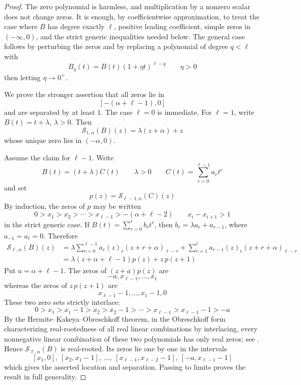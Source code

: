 \documentclass[a4paper,11pt,reqno]{amsart}
\numberwithin{equation}{section}
\theoremstyle{remark}
\begin{document}
\begin{proof}
The zero polynomial is harmless, and multiplication by a nonzero scalar does not change zeros. It is enough, by coefficientwise approximation, to treat the case where \(B\) has degree exactly \(\ell\), positive leading coefficient, simple zeros in \((-\infty,0)\), and the strict generic inequalities needed below. The general case follows by perturbing the zeros and by replacing a polynomial of degree \(q<\ell\) with
\[
  B_\eta(t)=B(t)(1+\eta t)^{\ell-q}
  \qquad \eta>0
\]
then letting \(\eta\to0^+\).

We prove the stronger assertion that all zeros lie in
\[
  [-(\alpha+\ell-1),0]
\]
and are separated by at least \(1\). The case \(\ell=0\) is immediate. For \(\ell=1\), write \(B(t)=t+\lambda\), \(\lambda>0\). Then
\[
  \mathcal S_{1,\alpha}(B)(z)
  =
  \lambda(z+\alpha)+z
\]
whose unique zero lies in \((-\alpha,0)\).

Assume the claim for \(\ell-1\). Write
\[
  B(t)=(t+\lambda)C(t)
  \qquad
  \lambda>0
  \qquad
  C(t)=\sum_{r=0}^{\ell-1}a_rt^r
\]
and set
\[
  p(z)=\mathcal S_{\ell-1,\alpha}(C)(z)
\]
By induction, the zeros of \(p\) may be written
\[
  0>x_1>x_2>\cdots>x_{\ell-1}>-(\alpha+\ell-2)
  \qquad
  x_i-x_{i+1}>1
\]
in the strict generic case. If \(B(t)=\sum_{r=0}^{\ell}b_rt^r\), then \(b_r=\lambda a_r+a_{r-1}\), where \(a_{-1}=a_\ell=0\). Therefore
\[
\begin{aligned}
  \mathcal S_{\ell,\alpha}(B)(z)
  &=
  \lambda
  \sum_{r=0}^{\ell-1}
  a_r(z)_r(z+r+\alpha)_{\ell-r}
  +
  \sum_{r=1}^{\ell}
  a_{r-1}(z)_r(z+r+\alpha)_{\ell-r}  \\
  &=
  \lambda(z+\alpha+\ell-1)p(z)+z\,p(z+1)
\end{aligned}
\]
Put \(a=\alpha+\ell-1\). The zeros of \((z+a)p(z)\) are
\[
  -a,x_{\ell-1},\ldots,x_1
\]
whereas the zeros of \(z\,p(z+1)\) are
\[
  x_{\ell-1}-1,\ldots,x_1-1,0
\]
These two zero sets strictly interlace:
\[
  0>x_1>x_1-1>x_2>x_2-1>\cdots>x_{\ell-1}>x_{\ell-1}-1>-a
\]
By the Hermite--Kakeya--Obreschkoff theorem, in the Obreschkoff form characterizing real-rootedness of all real linear combinations by interlacing, every nonnegative linear combination of these two polynomials has only real zeros; see \cite{RahmanSchmeisser2002,BorceaBranden2009}. Hence \(\mathcal S_{\ell,\alpha}(B)\) is real-rooted. Its zeros lie one by one in the intervals
\[
  [x_1,0],\ [x_2,x_1-1],\ \ldots,\
  [x_{\ell-1},x_{\ell-2}-1],\ [-a,x_{\ell-1}-1]
\]
which gives the asserted location and separation. Passing to limits proves the result in full generality.
\end{proof}
\end{document}
